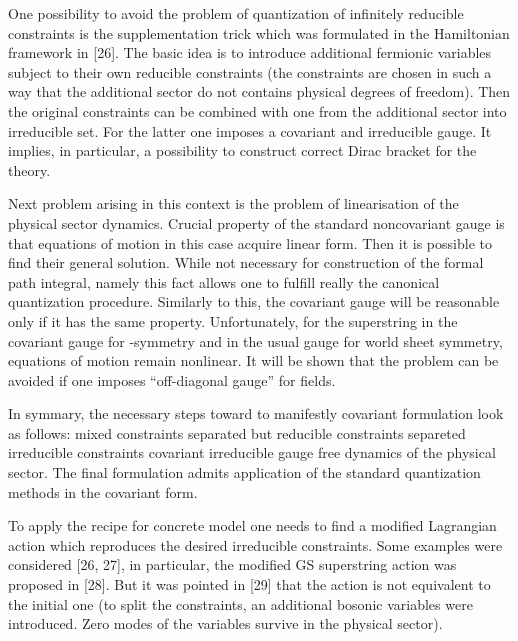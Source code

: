 \documentclass[a4paper]{article}
\begin{document}
One possibility to avoid the problem of quantization of infinitely 
reducible constraints is the supplementation trick which was formulated 
in the Hamiltonian framework in [26]. The basic idea is to introduce 
additional fermionic variables subject to their own reducible 
constraints (the constraints are chosen in such a way that the additional 
sector do not contains physical degrees of freedom). Then the original 
constraints can be combined with one from the additional sector into 
irreducible set. For the latter one imposes a covariant and irreducible 
gauge. It implies, in particular, a possibility to construct correct 
Dirac bracket for the theory. 

Next problem arising in this context is the problem of linearisation 
of the physical sector dynamics. Crucial property of the standard 
noncovariant gauge \coordHE{} is that equations of motion in 
this case acquire linear form. Then it is possible to find their 
general solution. While not necessary for construction of the formal 
path integral, namely this fact allows one to fulfill really the 
canonical quantization procedure. Similarly to this, the covariant 
gauge will be reasonable only if it has the same property. 
Unfortunately, for the superstring in the covariant gauge for 
\myHighlight{$\kappa$}\coordHE{}-symmetry and in the usual gauge for world sheet symmetry, 
equations of motion remain nonlinear. It will be shown that the 
problem can be avoided if one imposes ``off-diagonal gauge'' for 
\coordHE{} fields. 

In symmary, the necessary steps toward to manifestly covariant 
formulation look as follows: mixed constraints \myHighlight{$\mapsto$}\coordHE{} separated but 
reducible constraints \myHighlight{$\mapsto$}\coordHE{} separeted irreducible constraints 
\myHighlight{$\mapsto$}\coordHE{} covariant irreducible gauge \myHighlight{$\mapsto$}\coordHE{} free dynamics of the 
physical sector. The final formulation admits application of the 
standard quantization methods in the covariant form.

To apply the recipe for concrete model one needs to find a modified 
Lagrangian action which reproduces the desired irreducible constraints. 
Some examples were considered [26, 27], in particular, the modified 
\coordHE{} GS superstring  action was proposed in [28]. But it was pointed 
in [29]  that the action is not equivalent to the initial one (to split 
the constraints, an additional bosonic variables were introduced. Zero 
modes of the variables survive in the physical sector).
\end{document}
